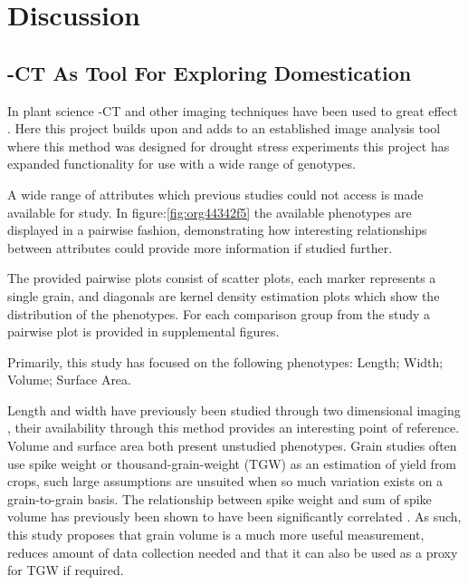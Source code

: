 \documentclass[11pt]{report}
\begin{document}
\chapter{Discussion}
\label{sec:org56edf3a}

\section{\textmu{}-CT As Tool For Exploring Domestication}
\label{sec:org9b1a916}
In plant science \textmu{}-CT and other imaging techniques have been used to great effect \cite{Hubeau2015,Staedler2013,Metzner2015}. Here this project builds upon and adds to an established image analysis tool \cite{Hughes2017} where this method was designed for drought stress experiments this project has expanded functionality for use with a wide range of genotypes.

A wide range of attributes which previous studies could not access \cite{Gegas2010} is made available for study. In figure:\ref{fig:org44342f5} the available phenotypes are displayed in a pairwise fashion, demonstrating how interesting relationships between attributes could provide more information if studied further.

The provided pairwise plots consist of scatter plots, each marker represents a single grain, and diagonals are kernel density estimation plots which show the distribution of the phenotypes. For each comparison group from the study a pairwise plot is provided in supplemental figures.

Primarily, this study has focused on the following phenotypes: Length; Width; Volume; Surface Area.

Length and width have previously been studied through two dimensional imaging \cite{Gegas2010}, their availability through this method provides an interesting point of reference. Volume and surface area both present unstudied phenotypes. Grain studies often use spike weight or thousand-grain-weight (TGW) as an estimation of yield from crops, such large assumptions are unsuited when so much variation exists on a grain-to-grain basis. The relationship between spike weight and sum of spike volume has previously been shown to have been significantly correlated \cite{Hughes2017}. As such, this study proposes that grain volume is a much more useful measurement, reduces amount of data collection needed and that it can also be used as a proxy for TGW if required.
\end{document}
